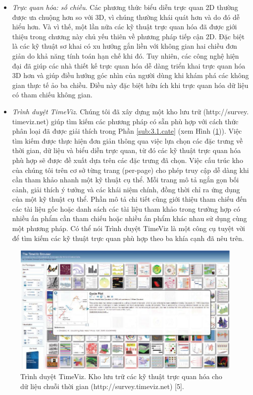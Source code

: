 \begin{itemize}
    \item \textit{Trực quan hóa: số chiều}. Các phương thức biểu diễn trực quan 2D thường được ưa chuộng hơn so với 3D, vì chúng thường khái quát hơn và do đó dễ hiểu hơn. Và vì thế, một lần nữa các kỹ thuật trực quan hóa đã được giới thiệu trong chương này chủ yếu thiên về phương pháp tiếp cận 2D. Đặc biệt là các kỹ thuật sơ khai có xu hướng gắn liền với không gian hai chiều đơn giản do khả năng tính toán hạn chế khi đó. Tuy nhiên, các công nghệ hiện đại đã giúp các nhà thiết kế trực quan hóa dễ dàng triển khai trực quan hóa 3D hơn và giúp điều hướng góc nhìn của người dùng khi khám phá các không gian thực tế ảo ba chiều. Điều này đặc biệt hữu ích khi trực quan hóa dữ liệu có tham chiếu không gian.
    \item \textit{Trình duyệt TimeViz}. Chúng tôi đã xây dựng một kho lưu trữ (http://survey. timeviz.net) giúp tìm kiếm các phương pháp có sẵn phù hợp với cách thức phân loại đã được giải thích trong Phần \ref{sub:3.1.cate} (xem Hình (\ref{fig:f7.17})). Việc tìm kiếm được thực hiện đơn giản thông qua việc lựa chọn các đặc trưng về thời gian, dữ liệu và biểu diễn trực quan, từ đó các kỹ thuật trực quan hóa phù hợp sẽ được đề xuất dựa trên các đặc trưng đã chọn. Việc cấu trúc kho của chúng tôi trên cơ sở từng trang (per-page) cho phép truy cập dễ dàng khi cần tham khảo nhanh một kỹ thuật cụ thể. Mỗi trang mô tả ngắn gọn bối cảnh, giải thích ý tưởng và các khái niệm chính, đồng thời chỉ ra ứng dụng của một kỹ thuật cụ thể. Phần mô tả chi tiết cũng giới thiệu tham chiếu đến các tài liệu gốc hoặc danh sách các tài liệu tham khảo trong trường hợp có nhiều ấn phẩm cần tham chiếu hoặc nhiều ấn phẩm khác nhau sử dụng cùng một phương pháp. Có thể nói Trình duyệt TimeViz là một công cụ tuyệt vời để tìm kiếm các kỹ thuật trực quan phù hợp theo ba khía cạnh đã nêu trên.
\end{itemize}
\begin{figure}[H] %
    \centering %
    \includegraphics[width=1\textwidth]{assets/fig_7_17.png} 
    \caption{Trình duyệt TimeViz. Kho lưu trữ các kỹ thuật trực quan hóa cho dữ liệu chuỗi thời gian (http://survey.timeviz.net) [5].} %
    \label{fig:f7.17}
\end{figure}
